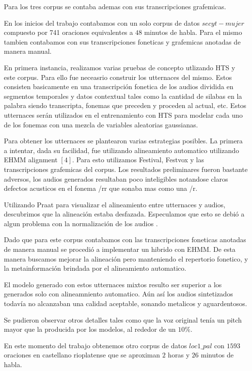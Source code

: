 Para los tres corpus se contaba ademas con sus transcripciones grafemicas. 

En los inicios del trabajo contabamos con un solo corpus de datos $secyt-mujer$ compuesto por 741 oraciones equivalentes a $48$ minutos de habla. Para el mismo tambien contabamos con sus transcripciones foneticas y grafemicas anotadas de manera manual.

En primera instancia, realizamos varias pruebas de concepto utlizando HTS y este corpus. Para ello fue neceasrio construir los utternaces del mismo. Estos consisten basicamente en una transcripción fonetica de los audios dividida en segmentos temporales y datos contextual tales como la cantidad de silabas en la palabra siendo transcripta, fonemas que preceden y proceden al actual, etc. Estos utternaces serán utilizados en el entrenamiento con HTS para modelar cada uno de los fonemas con una mezcla de variables aleatorias gaussianas. 

Para obtener los utternaces se plantearon varias estrategias posibles. La primera a intentar, dada su facilidad, fue utilizando alineamiento automatico utilizando EHMM alignment $[4]$. Para esto utilizamos Festival, Festvox y las transcripciones grafemicas del corpus. Los resultados preliminares fueron bastante adversos, los audios generados resultaban poco inteligibles notandose claros defectos acusticos en el fonema /rr que sonaba mas como una /r.

Utilizando Praat para visualizar el alineamiento entre utternaces y audios, descubrimos que la alineación estaba desfazada. Especulamos que esto se debió a algun problema con la normalización de los audios \completar.

Dado que para este corpus contabamos con las transcripciones foneticas anotadas de manera manual se procedió a implementar un hibrido con EHMM. De esta manera buscamos mejorar la alineación pero manteniendo el repertorio fonetico, y la metainformación brindada por el alineamiento automatico.

El modelo generado con estos utternaces mixtos resulto ser superior a los generados solo con alineamniento automatico. Aún así los audios sintetizados todavía no alcanzaban una calidad aceptable, sonando metalicos y aguardentosos.

Se pudieron observar otros detalles tales como que la voz original tenía un pitch mayor que la producida por los modelos, al rededor de un $10\%$.

En este momento del trabajo obtenemos otro corpus de datos $loc1\_pal$ con $1593$ oraciones en castellano rioplatense que se aproximan $2$ horas y $26$ minutos de habla.


